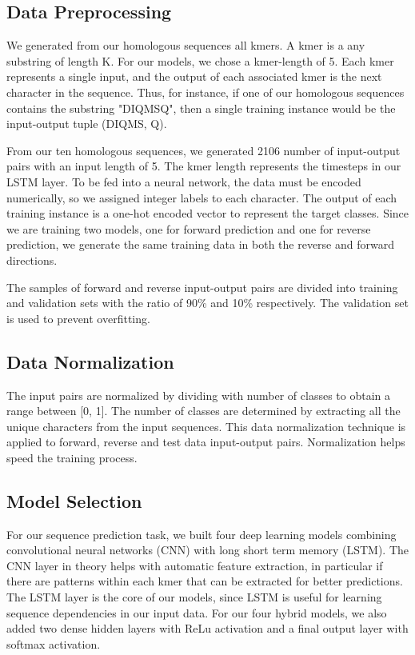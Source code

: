 \documentclass[journal]{IEEEtran}
\begin{document}
  \subsection{Data Preprocessing}
    We generated from our homologous sequences all kmers. A kmer is a any substring of length K. For our models, we chose a
    kmer-length of 5. Each kmer represents a single input, and the output of each associated kmer is the next character in the sequence.
    Thus, for instance, if one of our homologous sequences contains the substring "DIQMSQ", then a single training instance would be
    the input-output tuple (DIQMS, Q).

    From our ten homologous sequences, we generated 2106 number of input-output pairs with an input length of 5.
    The kmer length represents the timesteps in our LSTM layer.
    To be fed into a neural network, the data must be encoded numerically, so we assigned integer labels to each character.
    The output of each training instance is a
    one-hot encoded vector to represent the target classes. Since we are training two models, one for forward prediction
    and one for reverse prediction, we generate the same training data in both the reverse and forward directions.

    The samples of forward and reverse input-output pairs are divided into training and validation sets with the ratio of
    90\% and 10\% respectively. The validation set is used to prevent overfitting.

\subsection{Data Normalization}
    The input pairs are normalized by dividing with number of classes to obtain a range between [0, 1].
    The number of classes are determined by extracting all the unique characters from the input sequences.
    This data normalization technique is applied to forward, reverse and test data input-output pairs.
    Normalization helps speed the training process.

\subsection{Model Selection}

    For our sequence prediction task, we built four deep learning models combining convolutional neural
    networks (CNN) with long short term memory (LSTM). The CNN layer in theory helps with automatic feature extraction, in particular
    if there are patterns within each kmer that can be extracted for better predictions. The LSTM layer is the 
    core of our models, since LSTM is useful for learning sequence dependencies in our input data.
    For our four hybrid models, we also added two dense hidden layers with ReLu activation and a
    final output layer with softmax activation.
\end{document}
